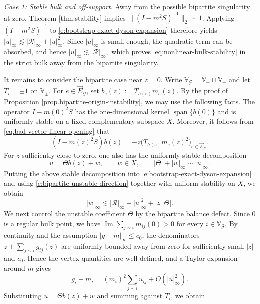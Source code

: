 \documentclass[11pt,twoside, a4paper]{article}
\numberwithin{equation}{section}
\numberwithin{figure}{section}
\theoremstyle{plain} %
\theoremstyle{definition}
\theoremstyle{remark}
\newcommand{\1} {\mspace{1 mu}}
\newcommand{\2} {\mspace{2 mu}}
\DeclareMathOperator{\im}{Im}
\begin{document}
\medskip
\noindent
\emph{Case 1: Stable bulk and off-support.}
Away from the possible bipartite singularity at zero, Theorem \ref{thm.stability} implies $\|(I-m^2S)^{-1}\|_2\sim 1$. Applying $(I-m^2S)^{-1}$ to
\eqref{e:bootstrap-exact-dyson-expansion} therefore yields
$
|u|_\infty
\lesssim
|\mathcal{R}|_\infty+|u|_\infty^2.
$
Since $|u|_\infty$ is small enough, the quadratic term can be absorbed, and hence
$
|u|_\infty\lesssim|\mathcal{R}|_\infty,
$
which proves \eqref{eq:nonlinear-bulk-stability} in the strict bulk away from the bipartite singularity.

It remains to consider the bipartite case near $z=0$.
Write
$
\mathbb V_{\mathcal G}=\mathbb V_+\sqcup\mathbb V_-
$
and let $T_i=\pm1$ on $\mathbb V_\pm$.
For $e\in\vec E_{\mathcal G}$, set
$
b_e(z):=T_{h(e)}m_e(z).
$
By the proof of Proposition \ref{prop.bipartite-origin-instability},
we may use the following facts. The operator $I-m(0)^2S$ has the
one-dimensional kernel $\operatorname{span}\{b(0)\}$ and is uniformly
stable on a fixed complementary subspace $X$. Moreover, it follows from \eqref{eq.bad-vector-linear-opening} that
\begin{equation}
\label{e:bipartite-unstable-direction}
(I-m(z)^2S)b(z)
=
-z\bigl(T_{h(e)}m_e(z)^2\bigr)_{e\in\vec E_{\mathcal G}}.
\end{equation}
For $z$ sufficiently close to zero, one also has the uniformly stable
decomposition
\[
u=\Theta b(z)+w,
\qquad
w\in X,
\qquad
|\Theta|+|w|_\infty\sim |u|_\infty.
\]
Putting the above stable decomposition into \eqref{e:bootstrap-exact-dyson-expansion} and using
\eqref{e:bipartite-unstable-direction} together with uniform stability on
$X$, we obtain
\begin{equation}
\label{e:bipartite-stable-part}
|w|_\infty
\lesssim
|\mathcal R|_\infty+|u|_\infty^2+|z||\Theta|.
\end{equation}
We next control the unstable coefficient $\Theta$ by the bipartite
balance defect. 
Since $0$ is a regular bulk point, we have
$\im\sum_{j\sim i}m_{ij}(0)>0$ for every $i\in\mathbb V_{\mathcal G}$.
By continuity and the assumption $|g-m|_\infty\le c_0$,
the denominators $z+\sum_{j\sim i}g_{ij}(z)$
are uniformly bounded away from zero for sufficiently
small $|z|$ and $c_0$.
Hence the vertex quantities are well-defined, and
a Taylor expansion around $m$ gives
\begin{equation}
\label{e:bipartite-vertex-expansion}
g_i-m_i
=
(m_i)^2\sum_{j\sim i}u_{ij}
+O(|u|_\infty^2).
\end{equation}
Substituting $u=\Theta b(z)+w$ and summing against $T_i$, we obtain
\end{document}
